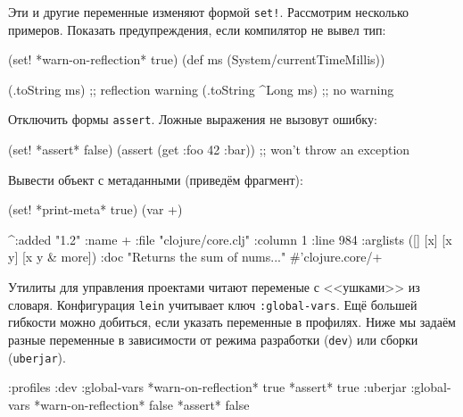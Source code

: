 Эти и другие переменные изменяют формой \verb|set!|. Рассмотрим несколько
примеров. Показать предупреждения, если компилятор не вывел тип:

\begin{english}
  \begin{clojure}
(set! *warn-on-reflection* true)
(def ms (System/currentTimeMillis))

(.toString ms)       ;; reflection warning
(.toString ^Long ms) ;; no warning
  \end{clojure}
\end{english}

\noindent
Отключить формы \verb|assert|. Ложные выражения не вызовут ошибку:

\begin{english}
  \begin{clojure}
(set! *assert* false)
(assert (get {:foo 42} :bar))
;; won't throw an exception
  \end{clojure}
\end{english}

\noindent
Вывести объект с метаданными (приведём фрагмент):

\begin{english}
  \begin{clojure}
(set! *print-meta* true)
(var +)

^{:added "1.2"
  :name +
  :file "clojure/core.clj"
  :column 1
  :line 984
  :arglists ([] [x] [x y] [x y & more])
  :doc "Returns the sum of nums..."}
#'clojure.core/+
  \end{clojure}
\end{english}


Утилиты для управления проектами читают переменые с <<ушками>> из
словаря. Конфигурация \verb|lein| учитывает ключ \verb|:global-vars|. Ещё
большей гибкости можно добиться, если указать переменные в профилях. Ниже мы
задаём разные переменные в зависимости от режима разработки (\verb|dev|) или
сборки (\verb|uberjar|).

\begin{english}
  \begin{clojure}
{:profiles
 :dev {:global-vars {*warn-on-reflection* true
                     *assert* true}}
 :uberjar {:global-vars {*warn-on-reflection* false
                         *assert* false}}}
  \end{clojure}
\end{english}


